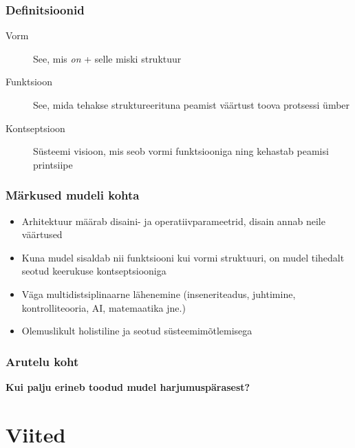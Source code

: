 \begin{frame}[fragile]
  \frametitle{Definitsioonid}
	\begin{description}
		\item[Vorm] See, mis \emph{on} + selle miski struktuur
		\item[Funktsioon] See, mida tehakse struktureerituna peamist väärtust toova protsessi ümber
		\item[Kontseptsioon] Süsteemi visioon, mis seob vormi funktsiooniga ning kehastab peamisi printsiipe
	\end{description}
\end{frame}

\begin{frame}[fragile]
  \frametitle{Märkused mudeli kohta}
	\begin{itemize}
		\item Arhitektuur määrab disaini- ja operatiivparameetrid, disain annab neile väärtused
		\item Kuna mudel sisaldab nii funktsiooni kui vormi struktuuri, on mudel tihedalt seotud keerukuse kontseptsiooniga
		\item Väga multidistsiplinaarne lähenemine (inseneriteadus, juhtimine, kontrolliteooria, AI, matemaatika jne.)
		\item Olemuslikult holistiline ja seotud süsteemimõtlemisega 
	\end{itemize}
\end{frame}

\begin{frame}[fragile]
  \frametitle{Arutelu koht}
		\begin{center}
			\textbf{Kui palju erineb toodud mudel harjumuspärasest?}
		\end{center}
\end{frame}

\section{Viited}

\begin{frame}[t,allowframebreaks,]
  	
	 

\end{frame}

